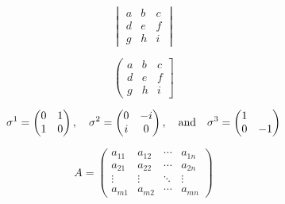\documentclass[letterpaper,notitlepage,11pt]{article}
\begin{document}
\[
\begin{vmatrix}
a & b & c \\
d & e & f \\
g & h & i
\end{vmatrix}
\]

\[
\left(\begin{matrix}
a & b & c \\
d & e & f \\
g & h & i
\end{matrix}\right]
\]

\[
\sigma^1 = \begin{pmatrix}
0 & 1 \\
1 & 0
\end{pmatrix}, \quad
\sigma^2 = \begin{pmatrix}
0 & -i \\
i & 0
\end{pmatrix}, \quad \text{and} \quad
\sigma^3 = \begin{pmatrix}
1 & \null \\
0 & -1
\end{pmatrix}
\]

\[
A =
\begin{pmatrix}
a_{11} & a_{12} & \cdots & a_{1n} \\
a_{21} & a_{22} & \cdots & a_{2n} \\
\vdots & \vdots & \ddots & \vdots \\
a_{m1} & a_{m2} & \cdots & a_{mn}
\end{pmatrix}
\]
\end{document}
